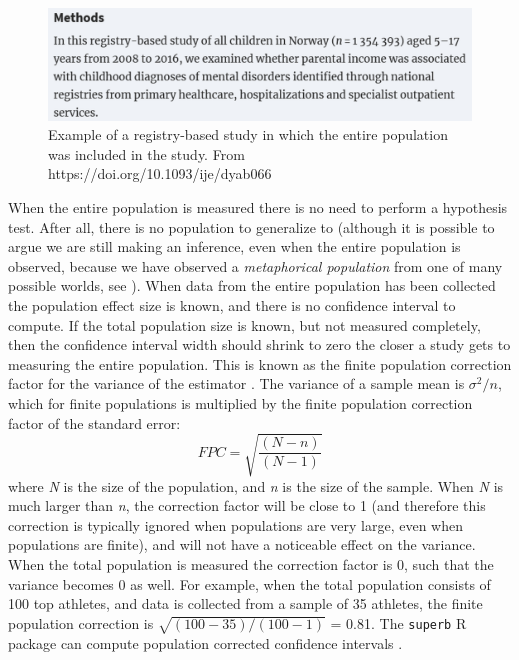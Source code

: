\documentclass[
]{krantz}
\begin{document}
\begin{figure}

{\centering \includegraphics[width=1\linewidth]{images/population} 

}

\caption{Example of a registry-based study in which the entire population was included in the study. From https://doi.org/10.1093/ije/dyab066}\label{fig:population}
\end{figure}

When the entire population is measured there is no need to perform a hypothesis test. After all, there is no population to generalize to (although it is possible to argue we are still making an inference, even when the entire population is observed, because we have observed a \emph{metaphorical population} from one of many possible worlds, see \citet{spiegelhalter_art_2019}). When data from the entire population has been collected the population effect size is known, and there is no confidence interval to compute. If the total population size is known, but not measured completely, then the confidence interval width should shrink to zero the closer a study gets to measuring the entire population. This is known as the finite population correction factor for the variance of the estimator \citep{kish_survey_1965}. The variance of a sample mean is \(\sigma^2/n\), which for finite populations is multiplied by the finite population correction factor of the standard error:
\[FPC = \sqrt{\frac{(N - n)}{(N-1)}}\]
where \emph{N} is the size of the population, and \emph{n} is the size of the sample. When \emph{N} is much larger than \emph{n}, the correction factor will be close to 1 (and therefore this correction is typically ignored when populations are very large, even when populations are finite), and will not have a noticeable effect on the variance. When the total population is measured the correction factor is 0, such that the variance becomes 0 as well. For example, when the total population consists of 100 top athletes, and data is collected from a sample of 35 athletes, the finite population correction is \(\sqrt{(100 - 35)/(100-1)}\) = 0.81. The \texttt{superb} R package can compute population corrected confidence intervals \citep{cousineau_superb_2019}.
\end{document}
